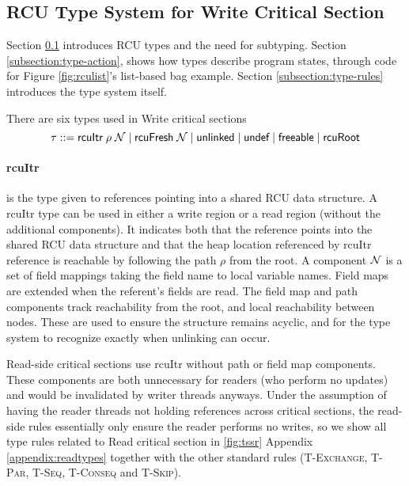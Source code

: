 \subsection{\textsf{RCU} Type System for \textsf{Write} Critical Section}
\label{subsection:rcu-typing}
Section \ref{subsection:rcu-typing} introduces \textsf{RCU} types and the need for subtyping. Section \ref{subsection:type-action}, shows how types describe program states, through code for Figure \ref{fig:rculist}'s list-based bag example. Section \ref{subsection:type-rules} introduces the type system itself.

\label{subsection:typwrt}
There are six types used in \textsf{Write} critical sections
\[
\tau ::=  \textsf{rcuItr}\;\rho\;\mathcal{N} \mid \textsf{rcuFresh}\;\mathcal{N}  \mid \textsf{unlinked} \mid \textsf{undef} \mid \textsf{freeable}
\mid \textsf{rcuRoot}\]
\paragraph{rcuItr} is the type given to references pointing into a shared RCU data structure. A \textsf{rcuItr} type can be used in either a write region or a read region (without the additional components). It indicates both that the reference points into the shared \textsf{RCU} data structure and that the heap location referenced by \textsf{rcuItr} reference is reachable by following the path $\rho$ from the root. A component $\mathcal{N}$ is a set of field mappings taking the field name to local variable names. Field maps are extended when the referent's fields are read.
The field map and path components track reachability from the root, and local reachability between nodes.  These are used to ensure the structure remains acyclic, and for the type system to recognize exactly when unlinking can occur.

Read-side critical sections use \textsf{rcuItr} without path or field map components.  These components are both unnecessary for readers (who perform no updates) and would be invalidated by writer threads anyways.
Under the assumption of having the reader threads not holding references across critical sections, the read-side rules essentially only ensure the reader performs no writes, so
we show all type rules related to \textsf{Read} critical section in \ref{fig:tssr} Appendix \ref{appendix:readtypes} together with the other standard rules (\textsc{T-Exchange}, \textsc{T-Par}, \textsc{T-Seq}, \textsc{T-Conseq} and \textsc{T-Skip}).
